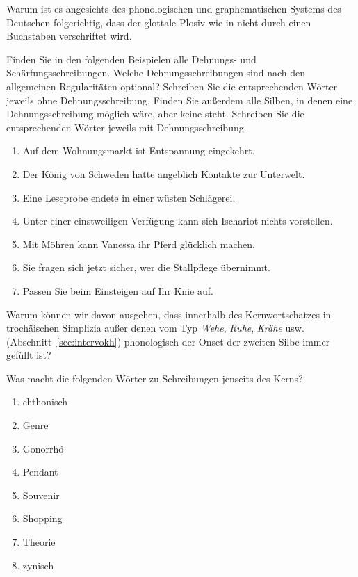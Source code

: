\Uebung[\tristar] \label{u143} Warum ist es angesichts des phonologischen und graphematischen Systems des Deutschen folgerichtig, dass der glottale Plosiv wie in \textipa{[PEnd@]} nicht durch einen Buchstaben verschriftet wird.

\Uebung \label{u144} Finden Sie in den folgenden Beispielen alle Dehnungs- und Schärfungsschreibungen.
Welche Dehnungsschreibungen sind nach den allgemeinen Regularitäten optional?
Schreiben Sie die entsprechenden Wörter jeweils ohne Dehnungsschreibung.
Finden Sie außerdem alle Silben, in denen eine Dehnungsschreibung möglich wäre, aber keine steht.
Schreiben Sie die entsprechenden Wörter jeweils mit Dehnungsschreibung.

\begin{enumerate}\Lf
  \item Auf dem Wohnungsmarkt ist Entspannung eingekehrt.
  \item Der König von Schweden hatte angeblich Kontakte zur Unterwelt.
  \item Eine Leseprobe endete in einer wüsten Schlägerei.
  \item Unter einer einstweiligen Verfügung kann sich Ischariot nichts vorstellen.
  \item Mit Möhren kann Vanessa ihr Pferd glücklich machen.
  \item Sie fragen sich jetzt sicher, wer die Stallpflege übernimmt.
  \item Passen Sie beim Einsteigen auf Ihr Knie auf. 
\end{enumerate}

\Uebung[\tristar] \label{u145} Warum können wir davon ausgehen, dass innerhalb des Kernwortschatzes in trochäischen Simplizia außer denen vom Typ \textit{Wehe}, \textit{Ruhe}, \textit{Krähe} usw. (Abschnitt~\ref{sec:intervokh}) phonologisch der Onset der zweiten Silbe immer gefüllt ist?

\Uebung \label{u146} Was macht die folgenden Wörter zu Schreibungen jenseits des Kerns?

\begin{enumerate}\Lf
  \item chthonisch
  \item Genre
  \item Gonorrhö
  \item Pendant
  \item Souvenir
  \item Shopping
  \item Theorie
  \item zynisch
\end{enumerate}

